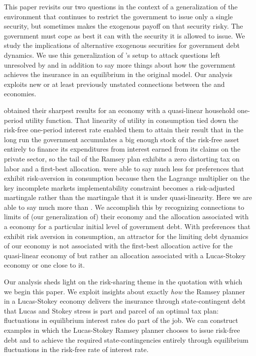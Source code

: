 \documentclass[12pt]{article}
\begin{document}
This paper revisits  our two questions in the context of a generalization of the \citet{Aiyagari2002} environment that continues to restrict
the government to issue only a single security, but sometimes makes the exogenous payoff on that security risky.  The  government
must cope as best it can with the security it is allowed to issue.  We study the implications of alternative exogenous securities for government debt dynamics.  We use this generalization of \citeauthor{Aiyagari2002}'s setup to attack questions left unresolved by \citeauthor{Aiyagari2002}
and in addition to say more things about how the government achieves  the insurance in an equilibrium in the original    \citet{LucasJr.1983}
model. Our analysis exploits  new or at least previously unstated connections between the \citeauthor{LucasJr.1983} and \citeauthor{Aiyagari2002} economies.

\citeauthor{Aiyagari2002} obtained their sharpest results for an economy with a quasi-linear household one-period utility function.
 That linearity of utility in consumption tied down the risk-free one-period interest rate enabled them to attain their result that in the long run the government accumulates a big enough stock of the risk-free asset entirely to finance its expenditures from interest earned from its claims
 on the private sector, so the tail of the Ramsey plan exhibits a zero distorting tax on labor and a first-best allocation.  
\citeauthor{Aiyagari2002} were able to say much less for preferences that exhibit risk-aversion in consumption because then the Lagrange multiplier
on the key incomplete markets implementability constraint becomes a risk-adjusted martingale rather than the martingale that it is under quasi-linearity.  Here we are able to say much more  than \citeauthor{Aiyagari2002}. We accomplish this by recognizing connections to limits of (our generalization of)
their economy and the allocation associated with a \citeauthor{LucasJr.1983} economy for a particular initial level of government debt.  
With preferences that exhibit risk aversion in consumption, an attractor for the limiting debt dynamics of our economy is not associated with  the first-best
allocation  active for the quasi-linear economy of \citeauthor{Aiyagari2002} but rather an allocation associated with a Lucas-Stokey economy or one close to it.

Our analysis sheds light on the risk-sharing theme in the quotation with which we begin this paper. We  exploit insights about exactly {\em how} the Ramsey planner
in a Lucas-Stokey economy delivers the insurance through state-contingent debt that Lucas and Stokey stress is part and parcel of an optimal tax plan:  fluctuations in
 equilibrium interest rates do part of the job.  We can construct examples in which the Lucas-Stokey Ramsey planner chooses to issue risk-free debt and to
 achieve the required state-contingencies entirely through equilibrium fluctuations in the risk-free rate of interest rate.
 
\end{document}
